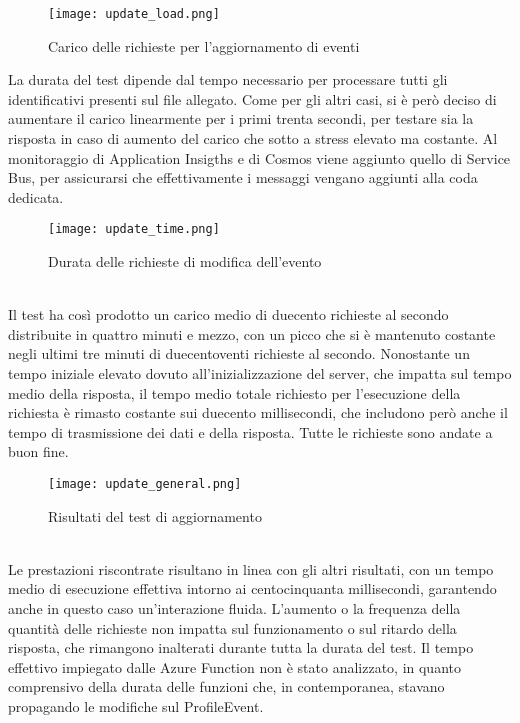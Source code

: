\begin{figure}[htbp]
    \begin{center}
        \texttt{[image: update\_load.png]}
        \caption{Carico delle richieste per l'aggiornamento di eventi}
    \end{center}
\end{figure}
La durata del test dipende dal tempo necessario 
per processare tutti gli identificativi presenti sul file allegato.
Come per gli altri casi, si è però deciso di aumentare il carico linearmente per i primi trenta secondi,
per testare sia la risposta in caso di aumento del carico che sotto a stress elevato ma costante.
Al monitoraggio di Application Insigths e di Cosmos
viene aggiunto quello di Service Bus, 
per assicurarsi che effettivamente i messaggi vengano aggiunti alla coda dedicata.\\
\begin{figure}[htbp]
    \begin{center}
        \texttt{[image: update\_time.png]}
        \caption{Durata delle richieste di modifica dell'evento}
    \end{center}
\end{figure}
\\
Il test ha così prodotto un carico medio di duecento richieste al secondo 
distribuite in quattro minuti e mezzo, 
con un picco che si è mantenuto costante negli ultimi tre minuti di duecentoventi richieste al secondo.
Nonostante un tempo iniziale elevato dovuto all'inizializzazione del server, 
che impatta sul tempo medio della risposta, 
il tempo medio totale richiesto per l'esecuzione della richiesta è rimasto costante sui duecento millisecondi,
che includono però anche il tempo di trasmissione dei dati e della risposta.
Tutte le richieste sono andate a buon fine.\\
\begin{figure}[htbp]
    \begin{center}
        \texttt{[image: update\_general.png]}
        \caption{Risultati del test di aggiornamento}
    \end{center}
\end{figure}
\\
Le prestazioni riscontrate risultano in linea con gli altri risultati,
con un tempo medio di esecuzione effettiva intorno ai centocinquanta millisecondi,
garantendo anche in questo caso un'interazione fluida.
L'aumento o la frequenza della quantità delle richieste non impatta
sul funzionamento o sul ritardo della risposta, 
che rimangono inalterati durante tutta la durata del test.
Il tempo effettivo impiegato dalle Azure Function non è stato analizzato,
in quanto comprensivo della durata delle funzioni che, in contemporanea,
stavano propagando le modifiche sul ProfileEvent.\\

